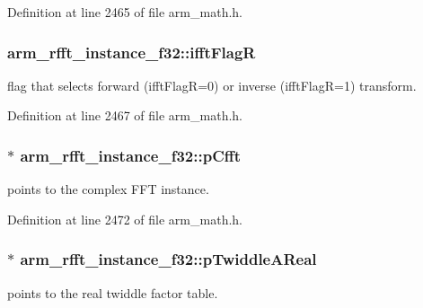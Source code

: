 Definition at line 2465 of file arm\-\_\-math.\-h.

\hypertarget{structarm__rfft__instance__f32_a5ee6d10a934ab4b666e0bb286c3d633f}{
\subsubsection[{ifft\-Flag\-R}]{ arm\-\_\-rfft\-\_\-instance\-\_\-f32\-::ifft\-Flag\-R}}\label{structarm__rfft__instance__f32_a5ee6d10a934ab4b666e0bb286c3d633f}
flag that selects forward (ifft\-Flag\-R=0) or inverse (ifft\-Flag\-R=1) transform. 

Definition at line 2467 of file arm\-\_\-math.\-h.

\hypertarget{structarm__rfft__instance__f32_a9f47ba9f50c81e4445ae3827b981bc05}{
\subsubsection[{p\-Cfft}]{$\ast$ arm\-\_\-rfft\-\_\-instance\-\_\-f32\-::p\-Cfft}}\label{structarm__rfft__instance__f32_a9f47ba9f50c81e4445ae3827b981bc05}
points to the complex F\-F\-T instance. 

Definition at line 2472 of file arm\-\_\-math.\-h.

\hypertarget{structarm__rfft__instance__f32_a534cc7e6e9b3e3dd022fad611c762142}{
\subsubsection[{p\-Twiddle\-A\-Real}]{$\ast$ arm\-\_\-rfft\-\_\-instance\-\_\-f32\-::p\-Twiddle\-A\-Real}}\label{structarm__rfft__instance__f32_a534cc7e6e9b3e3dd022fad611c762142}
points to the real twiddle factor table. 

